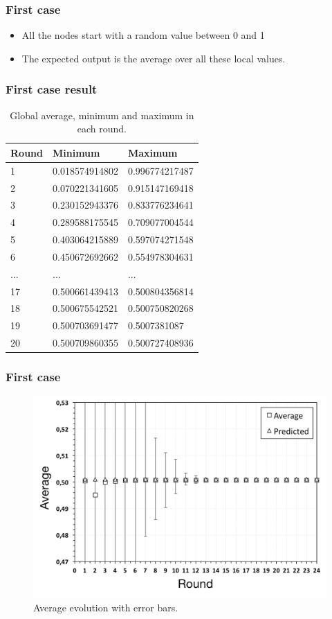 \documentclass{beamer}
\begin{document}
\begin{frame}
\frametitle{First case}

\begin{itemize}
  \item All the nodes start with a random value between 0 and 1
  \item The expected output is the average over all these local values.
\end{itemize}
\end{frame}


\begin{frame}
\frametitle{First case result}
\begin{table}
\begin{tabular}{l l l}
\toprule
\textbf{Round} & \textbf{Minimum} & \textbf{Maximum}\\
\midrule
1 & 0.018574914802 & 0.996774217487 \\
2 & 0.070221341605 & 0.915147169418 \\
3 & 0.230152943376 & 0.833776234641 \\
4 & 0.289588175545 & 0.709077004544 \\
5 & 0.403064215889 & 0.597074271548 \\
6 & 0.450672692662 & 0.554978304631 \\
... & ... & ... \\
17  & 0.500661439413 & 0.500804356814 \\
18  & 0.500675542521 & 0.500750820268 \\
19  & 0.500703691477 & 0.5007381087 \\
20  & 0.500709860355 & 0.500727408936 \\
\bottomrule
\end{tabular}
\caption{Global average, minimum and maximum in each round.}
\end{table}
\end{frame}

\begin{frame}
\frametitle{First case}
    
\begin{figure}[p]
\centering
\includegraphics[keepaspectratio=true, width=0.8\linewidth]{images/aggregation_average}
\caption{Average evolution with error bars.}
\label{fig:aggregation_average}
\end{figure}
\end{frame}
\end{document}
